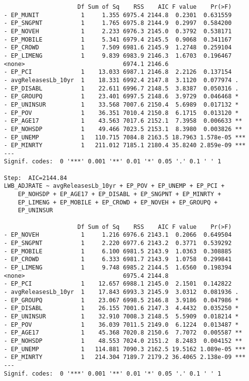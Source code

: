 \documentclass[
  12pt,
]{article}
\begin{document}
\begin{verbatim}
                     Df Sum of Sq    RSS    AIC F value    Pr(>F)    
- EP_MUNIT            1     1.355 6975.4 2144.8  0.2301  0.631559    
- EP_SNGPNT           1     1.765 6975.8 2144.9  0.2997  0.584200    
- EP_NOVEH            1     2.233 6976.3 2145.0  0.3792  0.538171    
- EP_MOBILE           1     5.341 6979.4 2145.5  0.9068  0.341167    
- EP_CROWD            1     7.509 6981.6 2145.9  1.2748  0.259104    
- EP_LIMENG           1     9.839 6983.9 2146.3  1.6703  0.196467    
<none>                            6974.1 2146.6                      
- EP_PCI              1    13.033 6987.1 2146.8  2.2126  0.137154    
- avgReleasesLb_10yr  1    18.331 6992.4 2147.8  3.1120  0.077974 .  
- EP_DISABL           1    22.611 6996.7 2148.5  3.8387  0.050316 .  
- EP_GROUPQ           1    23.401 6997.5 2148.6  3.9729  0.046468 *  
- EP_UNINSUR          1    33.568 7007.6 2150.4  5.6989  0.017132 *  
- EP_POV              1    36.351 7010.4 2150.8  6.1715  0.013120 *  
- EP_AGE17            1    43.563 7017.6 2152.1  7.3958  0.006633 ** 
- EP_NOHSDP           1    49.466 7023.5 2153.1  8.3980  0.003826 ** 
- EP_UNEMP            1   110.715 7084.8 2163.5 18.7963 1.578e-05 ***
- EP_MINRTY           1   211.012 7185.1 2180.4 35.8240 2.859e-09 ***
---
Signif. codes:  0 '***' 0.001 '**' 0.01 '*' 0.05 '.' 0.1 ' ' 1

Step:  AIC=2144.84
LWB_ADJRATE ~ avgReleasesLb_10yr + EP_POV + EP_UNEMP + EP_PCI + 
    EP_NOHSDP + EP_AGE17 + EP_DISABL + EP_SNGPNT + EP_MINRTY + 
    EP_LIMENG + EP_MOBILE + EP_CROWD + EP_NOVEH + EP_GROUPQ + 
    EP_UNINSUR

                     Df Sum of Sq    RSS    AIC F value    Pr(>F)    
- EP_NOVEH            1     1.216 6976.6 2143.1  0.2066  0.649504    
- EP_SNGPNT           1     2.220 6977.6 2143.2  0.3771  0.539292    
- EP_MOBILE           1     6.100 6981.5 2143.9  1.0363  0.308885    
- EP_CROWD            1     6.333 6981.7 2143.9  1.0758  0.299841    
- EP_LIMENG           1     9.748 6985.2 2144.5  1.6560  0.198394    
<none>                            6975.4 2144.8                      
- EP_PCI              1    12.657 6988.1 2145.0  2.1501  0.142822    
- avgReleasesLb_10yr  1    17.843 6993.3 2145.9  3.0312  0.081936 .  
- EP_GROUPQ           1    23.067 6998.5 2146.8  3.9186  0.047986 *  
- EP_DISABL           1    26.155 7001.6 2147.3  4.4432  0.035250 *  
- EP_UNINSUR          1    32.910 7008.3 2148.5  5.5909  0.018214 *  
- EP_POV              1    36.039 7011.5 2149.0  6.1224  0.013487 *  
- EP_AGE17            1    45.368 7020.8 2150.6  7.7072  0.005587 ** 
- EP_NOHSDP           1    48.553 7024.0 2151.2  8.2483  0.004152 ** 
- EP_UNEMP            1   114.881 7090.3 2162.5 19.5162 1.089e-05 ***
- EP_MINRTY           1   214.304 7189.7 2179.2 36.4065 2.138e-09 ***
---
Signif. codes:  0 '***' 0.001 '**' 0.01 '*' 0.05 '.' 0.1 ' ' 1


\end{verbatim}
\end{document}
